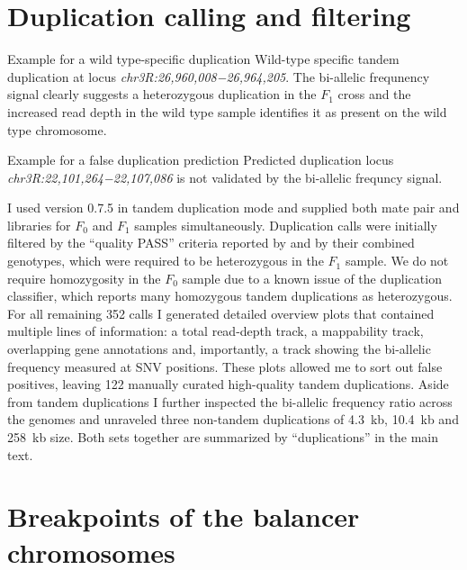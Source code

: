 \section{Duplication calling and filtering}
\label{sec:suppl_dup}

    {Example for a wild type-specific duplication}
    {Wild-type specific tandem duplication at locus
    \textit{chr3R:26,960,008−26,964,205}. The bi-allelic frequnency signal
    clearly suggests a heterozygous duplication in the $F_1$ cross and the
    increased read depth in the wild type sample identifies it as present on
    the wild type chromosome.}

    {Example for a false duplication prediction}
    {Predicted duplication locus \textit{chr3R:22,101,264−22,107,086} is not
    validated by the bi-allelic frequncy signal.}

I used \delly version 0.7.5 in tandem duplication mode and supplied both mate
pair and \wgs libraries for $F_0$ and $F_1$ samples simultaneously. Duplication
calls were initially filtered by the ``quality PASS'' criteria reported by
\delly and by their combined genotypes, which were required to be heterozygous
in the $F_1$ sample. We do not require homozygosity in the $F_0$ sample due to a
known issue of the duplication classifier, which reports many homozygous tandem
duplications as heterozygous. For all remaining 352 calls I generated detailed
overview plots that contained multiple lines of information: a total read-depth
track, a mappability track, overlapping gene annotations and, importantly, a
track showing the bi-allelic frequency measured at SNV positions. These plots
allowed me to sort out false positives, leaving 122 manually curated
high-quality tandem duplications. Aside from tandem duplications I further
inspected the bi-allelic frequency ratio across the genomes and unraveled three
non-tandem duplications of 4.3~kb, 10.4~kb and 258~kb size. Both sets together
are summarized by ``duplications'' in the main text.





\section{Breakpoints of the balancer chromosomes}
\label{sec:suppl_balancer_breakpoints}

